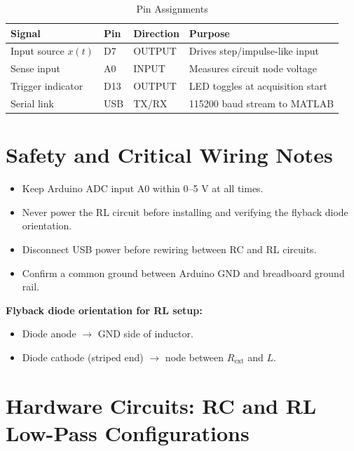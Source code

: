 \documentclass[11pt,letterpaper]{article}
\begin{document}
\begin{table}[H]
    \centering
    \caption{Pin Assignments}
    \label{tab:pins}
    \begin{tabularx}{\linewidth}{l l l X}
    \toprule
    \textbf{Signal} & \textbf{Pin} & \textbf{Direction} & \textbf{Purpose}\\
    \midrule
    Input source $x(t)$ & D7 & OUTPUT & Drives step/impulse-like input\\
    Sense input & A0 & INPUT & Measures circuit node voltage\\
    Trigger indicator & D13 & OUTPUT & LED toggles at acquisition start\\
    Serial link & USB & TX/RX & 115200 baud stream to MATLAB\\
    \bottomrule
    \end{tabularx}
\end{table}

\section{Safety and Critical Wiring Notes}

\begin{itemize}
    \item Keep Arduino ADC input A0 within 0--5 V at all times.
    \item Never power the RL circuit before installing and verifying the flyback diode orientation.
    \item Disconnect USB power before rewiring between RC and RL circuits.
    \item Confirm a common ground between Arduino GND and breadboard ground rail.
\end{itemize}

\textbf{Flyback diode orientation for RL setup:}
\begin{itemize}[nosep]
    \item Diode anode $\rightarrow$ GND side of inductor.
    \item Diode cathode (striped end) $\rightarrow$ node between $R_{\mathrm{ext}}$ and $L$.
\end{itemize}

\clearpage

\section{Hardware Circuits: RC and RL Low-Pass Configurations}
\end{document}
